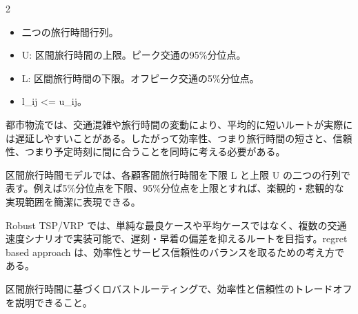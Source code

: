 \begin{multicols}{2}

\footnotesize

\raggedcolumns


\begin{itemize}
\item 二つの旅行時間行列。
\item U: 区間旅行時間の上限。ピーク交通の95\%分位点。
\item L: 区間旅行時間の下限。オフピーク交通の5\%分位点。
\item l\_ij <= u\_ij。
\end{itemize}

都市物流では、交通混雑や旅行時間の変動により、平均的に短いルートが実際には遅延しやすいことがある。したがって効率性、つまり旅行時間の短さと、信頼性、つまり予定時刻に間に合うことを同時に考える必要がある。\par

区間旅行時間モデルでは、各顧客間旅行時間を下限 L と上限 U の二つの行列で表す。例えば5\%分位点を下限、95\%分位点を上限とすれば、楽観的・悲観的な実現範囲を簡潔に表現できる。\par

Robust TSP/VRP では、単純な最良ケースや平均ケースではなく、複数の交通速度シナリオで実装可能で、遅刻・早着の偏差を抑えるルートを目指す。regret based approach は、効率性とサービス信頼性のバランスを取るための考え方である。\par

区間旅行時間に基づくロバストルーティングで、効率性と信頼性のトレードオフを説明できること。\par


\end{multicols}
